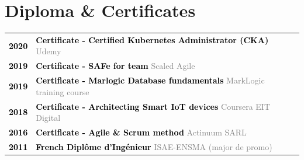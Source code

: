 \documentclass[10pt,A4]{article}
\begin{document}
\begin{minipage}[c]{0.7\textwidth}
\section*{\hspace{0.5cm}Diploma \& Certificates}
%
\begin{tabular}{P{2cm}p{11cm}}
\textcolor{black}{\bf 2020} & \textcolor{black}{ \bf Certificate - Certified Kubernetes Administrator (CKA)}  \newline \small \textcolor{gray}{Udemy} \\
\textcolor{black}{\bf 2019} & \textcolor{black}{ \bf Certificate - SAFe for team}  \newline \small \textcolor{gray}{Scaled Agile} \\
\textcolor{black}{\bf 2019} & \textcolor{black}{ \bf Certificate - Marlogic Database fundamentals} \newline \small \textcolor{gray}{MarkLogic training course} \\
\textcolor{black}{\bf 2018} & \textcolor{black}{ \bf Certificate - Architecting Smart IoT devices} \newline \small \textcolor{gray}{Coursera EIT Digital} \\
\textcolor{black}{\bf 2016} & \textcolor{black}{ \bf Certificate - Agile \& Scrum method} \newline \small \textcolor{gray}{Actinuum SARL} \\
\textcolor{black}{\bf 2011} & \textcolor{black}{ \bf French Diplôme d'Ingénieur} \newline \small \textcolor{gray}{ISAE-ENSMA (major de promo)} \\
\end{tabular}
%
\end{minipage}
\begin{minipage}[t]{0.01\textwidth}
\hspace{1mm}
\end{minipage}
\end{document}
